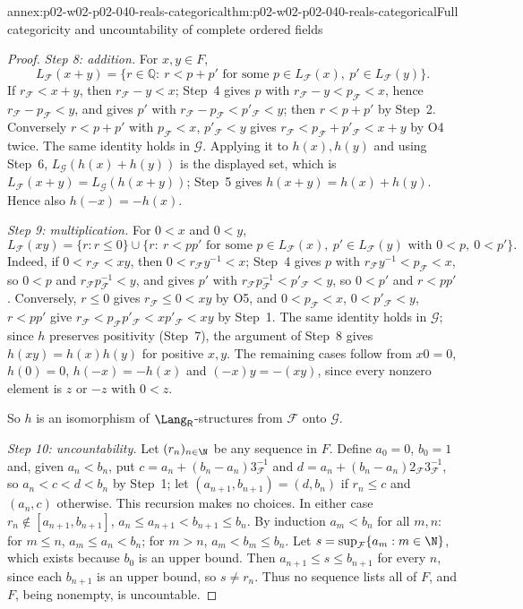 \begin{annexitem}{annex:p02-w02-p02-040-reals-categorical}{thm:p02-w02-p02-040-reals-categorical}{Full categoricity and uncountability of complete ordered fields}
\begin{proof}
\emph{Step 8: addition.}  For \(x,y\in F\),
\[
 L_{\mathcal F}(x+y)=\{r\in\mathbb Q:\ r<p+p'\text{ for some }p\in L_{\mathcal F}(x),\ p'\in L_{\mathcal F}(y)\}.
\]
If \(r_{\mathcal F}<x+y\), then \(r_{\mathcal F}-y<x\); Step~4 gives \(p\) with
\(r_{\mathcal F}-y<p_{\mathcal F}<x\), hence \(r_{\mathcal F}-p_{\mathcal F}<y\), and
gives \(p'\) with \(r_{\mathcal F}-p_{\mathcal F}<p'_{\mathcal F}<y\); then
\(r<p+p'\) by Step~2.  Conversely \(r<p+p'\) with \(p_{\mathcal F}<x\),
\(p'_{\mathcal F}<y\) gives \(r_{\mathcal F}<p_{\mathcal F}+p'_{\mathcal F}<x+y\) by
O4 twice.  The same identity holds in \(\mathcal G\).  Applying it to
\(h(x),h(y)\) and using Step~6,
\(L_{\mathcal G}(h(x)+h(y))\) is the displayed set, which is
\(L_{\mathcal F}(x+y)=L_{\mathcal G}(h(x+y))\); Step~5 gives
\(h(x+y)=h(x)+h(y)\).  Hence also \(h(-x)=-h(x)\).

\emph{Step 9: multiplication.}  For \(0<x\) and \(0<y\),
\[
 L_{\mathcal F}(xy)=\{r:r\le0\}\cup
 \{r:\ r<pp'\text{ for some }p\in L_{\mathcal F}(x),\ p'\in L_{\mathcal F}(y)\text{ with }0<p,\ 0<p'\}.
\]
Indeed, if \(0<r_{\mathcal F}<xy\), then \(0<r_{\mathcal F}y^{-1}<x\); Step~4
gives \(p\) with \(r_{\mathcal F}y^{-1}<p_{\mathcal F}<x\), so \(0<p\) and
\(r_{\mathcal F}p_{\mathcal F}^{-1}<y\), and gives \(p'\) with
\(r_{\mathcal F}p_{\mathcal F}^{-1}<p'_{\mathcal F}<y\), so \(0<p'\) and \(r<pp'\).
Conversely, \(r\le0\) gives \(r_{\mathcal F}\le0<xy\) by O5, and
\(0<p_{\mathcal F}<x\), \(0<p'_{\mathcal F}<y\), \(r<pp'\) give
\(r_{\mathcal F}<p_{\mathcal F}p'_{\mathcal F}<xp'_{\mathcal F}<xy\) by Step~1.  The
same identity holds in \(\mathcal G\); since \(h\) preserves positivity
(Step~7), the argument of Step~8 gives \(h(xy)=h(x)h(y)\) for positive
\(x,y\).  The remaining cases follow from \(x0=0\), \(h(0)=0\),
\(h(-x)=-h(x)\) and \((-x)y=-(xy)\), since every nonzero element is
\(z\) or \(-z\) with \(0<z\).

So \(h\) is an isomorphism of \(\Lang_{\mathsf R}\)-structures from
\(\mathcal F\) onto \(\mathcal G\).

\emph{Step 10: uncountability.}  Let \((r_n)_{n\in\N}\) be any sequence in
\(F\).  Define \(a_0=0\), \(b_0=1\) and, given \(a_n<b_n\), put
\(c=a_n+(b_n-a_n)3_{\mathcal F}^{-1}\) and \(d=a_n+(b_n-a_n)2_{\mathcal F}3_{\mathcal F}^{-1}\),
so \(a_n<c<d<b_n\) by Step~1; let \((a_{n+1},b_{n+1})=(d,b_n)\) if
\(r_n\le c\) and \((a_n,c)\) otherwise.  This recursion makes no choices.
In either case \(r_n\notin[a_{n+1},b_{n+1}]\),
\(a_n\le a_{n+1}<b_{n+1}\le b_n\).  By induction \(a_m<b_n\) for all \(m,n\):
for \(m\le n\), \(a_m\le a_n<b_n\); for \(m>n\), \(a_m<b_m\le b_n\).  Let
\(s=\sup_{\mathcal F}\{a_m:m\in\N\}\), which exists because \(b_0\) is an
upper bound.  Then \(a_{n+1}\le s\le b_{n+1}\) for every \(n\), since each
\(b_{n+1}\) is an upper bound, so \(s\neq r_n\).  Thus no sequence lists all
of \(F\), and \(F\), being nonempty, is uncountable.
\end{proof}
\end{annexitem}

